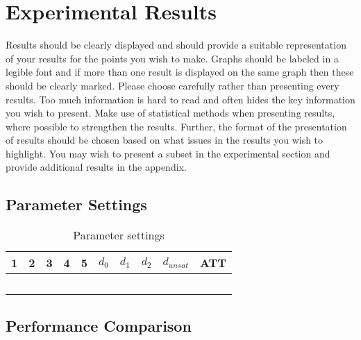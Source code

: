 \section{Experimental Results}

Results should be clearly displayed and should provide a suitable representation of your results for the points you wish to make. Graphs should be labeled in a legible font and if more than one result is displayed on the same graph then these should be clearly marked.   Please choose carefully rather than presenting every results. Too much information is hard to read and often hides the key information you wish to present. Make use of statistical methods when presenting results, where possible to strengthen the results.  Further, the format of the presentation of results should be chosen based on what issues in the results you wish to highlight. You may wish to present a subset in the experimental section and provide additional results in the appendix.


\subsection{Parameter Settings}

\begin{table}[H]
\centering
    \begin{tabular}{|l|l|l|l|l||l|l|l|l|l|}

 	\hline
 	1 & 2 & 3 & 4 & 5 & $d_0$ & $d_1$ & $d_2$ & $d_{unsat}$ & ATT \\
 	\hline
    ~ & ~ & ~ & ~ & ~ & ~ & ~ & ~ & ~ & ~ \\

	\hline
    \end{tabular}
    \caption {Parameter settings}
    \label{table:parameterSettings}

\end{table}

\subsection{Performance Comparison}